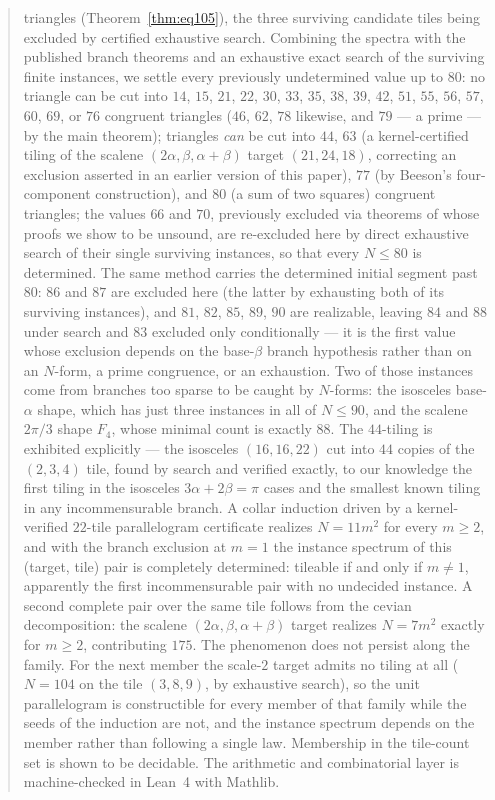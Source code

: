 \documentclass[11pt,reqno]{amsart}
\theoremstyle{plain}
\theoremstyle{definition}
\begin{document}
\begin{abstract}
triangles (Theorem~\ref{thm:eq105}), the three surviving candidate tiles being excluded by
certified exhaustive search. Combining the spectra with the published
branch theorems and an exhaustive exact search of the surviving finite instances, we settle every
previously undetermined value up to $80$: no triangle can be cut into $14$, $15$, $21$, $22$, $30$,
$33$, $35$, $38$, $39$, $42$, $51$, $55$, $56$, $57$, $60$, $69$, or $76$ congruent triangles
($46$, $62$, $78$ likewise, and $79$ --- a prime --- by the main theorem); triangles \emph{can} be cut
into $44$, $63$ (a kernel-certified tiling of the scalene $(2\alpha,\beta,\alpha{+}\beta)$ target
$(21,24,18)$, correcting an exclusion asserted in an earlier version of this paper), $77$ (by
Beeson's four-component construction), and $80$ (a sum of two squares) congruent
triangles; the values $66$ and $70$, previously excluded via theorems of \cite{BeesonIII} whose
proofs we show to be unsound, are re-excluded here by direct exhaustive search of their single
surviving instances, so that every $N\le80$ is determined. The same method carries the determined
initial segment past $80$: $86$ and $87$ are excluded here (the latter by exhausting both of its
surviving instances), and $81$, $82$, $85$, $89$, $90$ are realizable, leaving $84$ and $88$ under
search and $83$ excluded only conditionally --- it is the first value whose exclusion depends on the
base-$\beta$ branch hypothesis rather than on an $N$-form, a prime congruence, or an exhaustion. Two of those instances come from branches too sparse to be caught by
$N$-forms: the isosceles base-$\alpha$ shape, which has just three instances in all of $N\le90$, and
the scalene $2\pi/3$ shape $F_4$, whose minimal count is exactly $88$. The $44$-tiling is exhibited explicitly --- the isosceles $(16,16,22)$
cut into $44$ copies of the $(2,3,4)$ tile, found by search and verified exactly, to our
knowledge the first tiling in the isosceles $3\alpha+2\beta=\pi$ cases and the smallest known
tiling in any incommensurable branch. A collar induction driven by a kernel-verified $22$-tile
parallelogram certificate realizes $N=11m^2$ for every $m\ge2$, and with the branch exclusion at
$m=1$ the instance spectrum of this (target, tile) pair is completely determined: tileable if and
only if $m\ne1$, apparently the first incommensurable pair with no undecided instance. A second
complete pair over the same tile follows from the cevian decomposition: the scalene
$(2\alpha,\beta,\alpha{+}\beta)$ target realizes $N=7m^2$ exactly for $m\ge2$, contributing
$175$. The phenomenon does not persist along the family. For the next member the scale-$2$ target admits no
tiling at all ($N=104$ on the tile $(3,8,9)$, by exhaustive search), so the unit parallelogram is
constructible for every member of that family while the seeds of the induction are not, and the
instance spectrum depends on the member rather than following a single law. Membership in the
tile-count set is shown to be decidable. The arithmetic and combinatorial layer is
machine-checked in Lean~4 with Mathlib.
\end{abstract}
\end{document}
